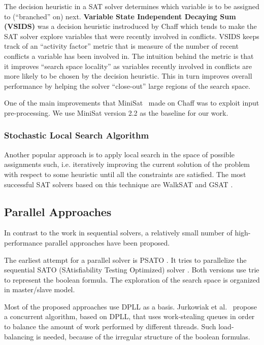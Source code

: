 \documentclass[letterpaper, compsoc, conference]{IEEEtran}
\begin{document}
The decision heuristic in a SAT solver determines which variable is to be
assigned to (``branched'' on) next.  \textbf{Variable State Independent
Decaying Sum (VSIDS)} was a decision heuristic instroduced by Chaff which tends
to make the SAT solver explore variables that were recently involved in
conflicts. VSIDS keeps track of an ``activity factor'' metric that is measure
of the number of recent conflicts a variable has been involved in.  The
intuition behind the metric is that it improves ``search space locality'' as
variables recently involved in conflicts are more likely to be chosen by the
decision heuristic.  This in turn improves overall performance by helping the
solver ``close-out'' large regions of the search space.

One of the main improvements that MiniSat~\cite{MiniSat} made on Chaff was
to exploit input pre-processing. We use MiniSat version 2.2 as the
baseline for our work.

\subsubsection{Stochastic Local Search Algorithm}
Another popular approach is to apply local search in the space of possible
assignments such, i.e. iteratively improving the current solution of the
problem with respect to some heuristic until all the constraints are satisfied.
The most successful SAT solvers based on this technique are WalkSAT
\cite{WalkSAT} and GSAT \cite{GSAT}.

\subsection{Parallel Approaches}
In contrast to the work in sequential solvers, a relatively small number of 
high-performance parallel approaches have been proposed.

\indent The earliest attempt for a parallel solver is PSATO \cite{PSATO}. It tries
to parallelize the sequential SATO (SAtisfiability Testing Optimized) solver
\cite{SATO}. Both versions use trie to represent the boolean formula. The exploration
of the search space is organized in master/slave model.

\indent Most of the proposed approaches use DPLL as a basis. Jurkowiak et al.~\cite{Jurkowiak} propose a concurrent algorithm, based on DPLL, that uses work-stealing queues in order to balance the amount of work performed by different threads. Such load-balancing is needed, because of the irregular structure of the boolean formulas. 
\end{document}
